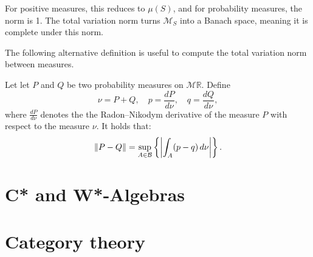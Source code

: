 For positive measures, this reduces to \( \mu(S) \), and for probability measures, the norm is 1. The total variation norm turns \( \mathcal{M}_S \) into a Banach space, meaning it is complete under this norm. 

The following alternative definition is useful to compute the total variation norm between measures.

  \begin{definition} \cite{tsybakov2008}
    Let  let $P$ and $Q$ be two probability measures on $\mathcal{M}\mathbb{R}$. Define
    $$
      \nu = P + Q, \quad p = \frac{dP}{d\nu}, \quad q = \frac{dQ}{d\nu},
    $$
    where $\frac{dP}{d\nu}$ denotes the  the Radon–Nikodym derivative of the measure $P$ with respect to the measure $\nu$. It holds that:
    \begin{align*}
      \left\lVert P-Q \right\rVert = \sup_{A \in  \mathcal{B}} \left\{ \left\vert \int_{A} (p - q) \, d\nu \right\vert \right\}.
    \end{align*}

  \end{definition}

  
  


   











\section{C* and W*-Algebras} \label{sec:c*_w*}


\section{Category theory} \label{sec:catgories}


